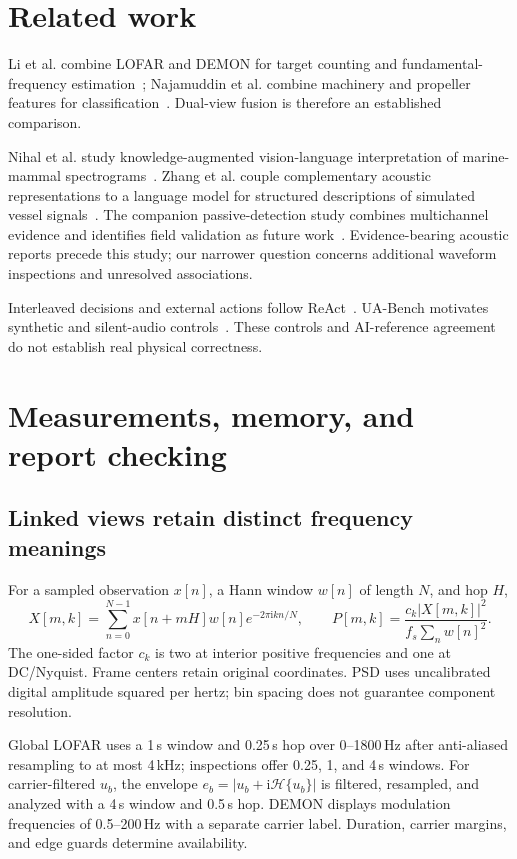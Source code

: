 \documentclass[runningheads,orivec]{llncs}
\begin{document}
\section{Related work}
Li et al. combine LOFAR and DEMON for target counting and fundamental-frequency estimation~\cite{li2022lofar}; Najamuddin et al. combine machinery and propeller features for classification~\cite{najamuddin2026fusion}. Dual-view fusion is therefore an established comparison.

Nihal et al. study knowledge-augmented vision-language interpretation of marine-mammal spectrograms~\cite{nihal2025knowledge}. Zhang et al. couple complementary acoustic representations to a language model for structured descriptions of simulated vessel signals~\cite{zhang2026evidence1}. The companion passive-detection study combines multichannel evidence and identifies field validation as future work~\cite{li2026evidence2}. Evidence-bearing acoustic reports precede this study; our narrower question concerns additional waveform inspections and unresolved associations.

Interleaved decisions and external actions follow ReAct~\cite{yao2023react}. UA-Bench motivates synthetic and silent-audio controls~\cite{sun2026uabench}. These controls and AI-reference agreement do not establish real physical correctness.

\section{Measurements, memory, and report checking}
\subsection{Linked views retain distinct frequency meanings}
For a sampled observation $x[n]$, a Hann window $w[n]$ of length $N$, and hop $H$,
\begin{equation}
X[m,k]=\sum_{n=0}^{N-1}x[n+mH]w[n]e^{-2\pi\mathrm{i}kn/N},
\qquad
P[m,k]=\frac{c_k|X[m,k]|^2}{f_s\sum_nw[n]^2}.
\end{equation}
The one-sided factor $c_k$ is two at interior positive frequencies and one at DC/Nyquist. Frame centers retain original coordinates. PSD uses uncalibrated digital amplitude squared per hertz; bin spacing does not guarantee component resolution.

Global LOFAR uses a 1\,s window and 0.25\,s hop over 0--1800\,Hz after anti-aliased resampling to at most 4\,kHz; inspections offer 0.25, 1, and 4\,s windows. For carrier-filtered $u_b$, the envelope $e_b=|u_b+\mathrm{i}\mathcal H\{u_b\}|$ is filtered, resampled, and analyzed with a 4\,s window and 0.5\,s hop. DEMON displays modulation frequencies of 0.5--200\,Hz with a separate carrier label. Duration, carrier margins, and edge guards determine availability.
\end{document}
